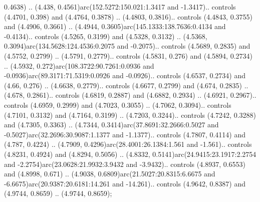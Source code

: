 0.4638) .. (4.438, 0.4561)arc(152.5272:150.021:1.3417 and -1.3417).. controls (4.4701, 0.398) and (4.4764, 0.3878) .. (4.4803, 0.3816).. controls (4.4843, 0.3755) and (4.4906, 0.3661) .. (4.4944, 0.3605)arc(145.1333:138.7636:0.4134 and -0.4134).. controls (4.5265, 0.3199) and (4.5328, 0.3132) .. (4.5368, 0.3094)arc(134.5628:124.4536:0.2075 and -0.2075).. controls (4.5689, 0.2835) and (4.5752, 0.2799) .. (4.5791, 0.2779).. controls (4.5831, 0.276) and (4.5894, 0.2734) .. (4.5932, 0.272)arc(108.3722:90.7261:0.0936 and -0.0936)arc(89.3171:71.5319:0.0926 and -0.0926).. controls (4.6537, 0.2734) and (4.66, 0.276) .. (4.6638, 0.2779).. controls (4.6677, 0.2799) and (4.674, 0.2835) .. (4.678, 0.2861).. controls (4.6819, 0.2887) and (4.6882, 0.2934) .. (4.6921, 0.2967).. controls (4.6959, 0.2999) and (4.7023, 0.3055) .. (4.7062, 0.3094).. controls (4.7101, 0.3132) and (4.7164, 0.3199) .. (4.7203, 0.3244).. controls (4.7242, 0.3288) and (4.7305, 0.3363) .. (4.7344, 0.3414)arc(37.8691:32.2666:0.5027 and -0.5027)arc(32.2696:30.9087:1.1377 and -1.1377).. controls (4.7807, 0.4114) and (4.787, 0.4224) .. (4.7909, 0.4296)arc(28.4001:26.1384:1.561 and -1.561).. controls (4.8231, 0.4924) and (4.8294, 0.5056) .. (4.8332, 0.5141)arc(24.9415:23.1917:2.2754 and -2.2754)arc(23.0628:21.9932:3.9432 and -3.9432).. controls (4.8937, 0.6553) and (4.8998, 0.671) .. (4.9038, 0.6809)arc(21.5027:20.8315:6.6675 and -6.6675)arc(20.9387:20.6181:14.261 and -14.261).. controls (4.9642, 0.8387) and (4.9744, 0.8659) .. (4.9744, 0.8659);



